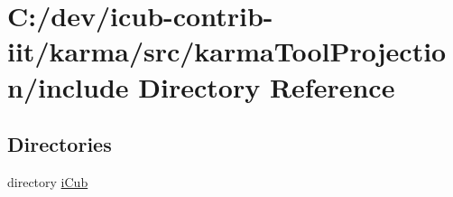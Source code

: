 \section{C\+:/dev/icub-\/contrib-\/iit/karma/src/karma\+Tool\+Projection/include Directory Reference}
\label{dir_fe78f95ef73225985cbb37ca6fe2b4d3}
\subsection*{Directories}
\begin{DoxyCompactItemize}
\item 
directory \hyperlink{dir_2c4c692e0e93e67fe6dacb9253ee9a1d}{i\+Cub}
\end{DoxyCompactItemize}

